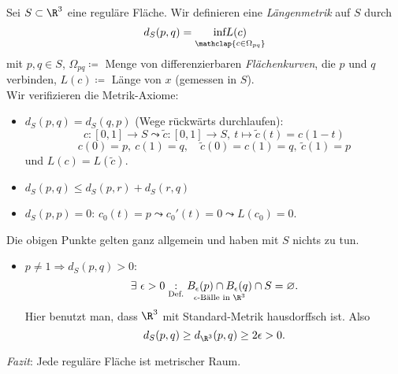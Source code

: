 \begin{remark}[Reguläre Fläche = Metrischer Raum]
  Sei \( S \subset \R^3 \) eine reguläre Fläche. Wir definieren eine \emph{Längenmetrik} auf \( S \) durch
  \begin{equation*}
    d_S(p,q) = \underset{\mathclap{\substack{c \in \Omega_{pq}}}}{\text{inf}L(c)}
  \end{equation*}
  mit \( p,q \in S \), \( \Omega_{pq} \coloneqq \) Menge von differenzierbaren \emph{Flächenkurven}, die \( p \) und \( q \) verbinden, \( L(c) \coloneqq \) Länge von \( x \) (gemessen in \( S \)).
  \\
  Wir verifizieren die Metrik-Axiome:
  \begin{itemize}
    \item \( d_S(p,q) = d_S(q,p) \) (Wege rückwärts durchlaufen):
    \begin{equation*}
       c: [0,1] \to S \leadsto \tilde{c}: [0,1] \to S, \ t \mapsto \tilde{c}(t) = c(1-t)
     \end{equation*} 
     \begin{equation*}
       c(0) = p, \ c(1) = q, \quad \tilde{c}(0) = c(1) = q, \ \tilde{c}(1) = p
     \end{equation*}
     und \( L(c) = L(\tilde{c}) \).

    \item \( d_S(p,q) \leq d_S(p,r) + d_S(r,q) \)
    \item \( d_S(p,p) = 0 \): \( c_0(t) = p \leadsto c_0'(t) = 0 \leadsto L(c_0) = 0 \).
  \end{itemize}
  Die obigen Punkte gelten ganz allgemein und haben mit \( S \) nichts zu tun.
  \begin{itemize}
    \item \( p \neq 1 \Rightarrow d_S(p,q) > 0 \):
    \begin{equation*}
       \exists \ \epsilon > 0 \underset{\text{Def.}}{:} \underset{\epsilon\text{-Bälle in } \R^3}{B_\epsilon(p) \cap B_\epsilon(q)} \cap S = \varnothing\text{.}
     \end{equation*} 
     Hier benutzt man, dass \( \R^3 \) mit Standard-Metrik hausdorffsch ist. Also
     \begin{equation*}
       d_S(p,q) \geq d_{\R^3}(p,q) \geq 2\epsilon > 0\text{.}
     \end{equation*}
  \end{itemize}
  \emph{Fazit}: Jede reguläre Fläche ist metrischer Raum.
\end{remark}

